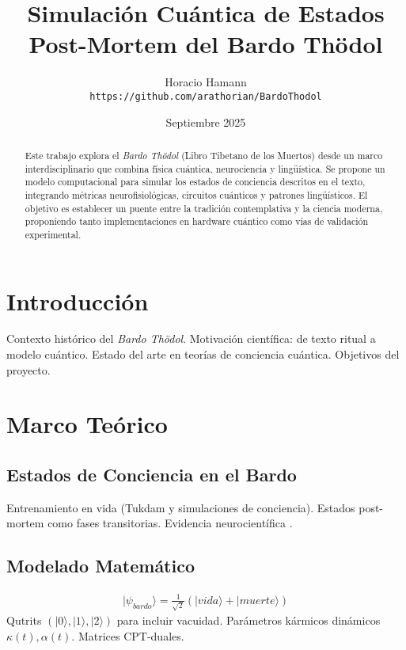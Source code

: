 \documentclass[12pt,a4paper]{article}
\title{\textbf{Simulación Cuántica de Estados Post-Mortem del Bardo Thödol}}
\author{Horacio Hamann \\ \texttt{https://github.com/arathorian/BardoThodol}}
\date{Septiembre 2025}
\begin{document}
\maketitle

\begin{abstract}
Este trabajo explora el \emph{Bardo Thödol} (Libro Tibetano de los Muertos) 
desde un marco interdisciplinario que combina física cuántica, neurociencia 
y lingüística. Se propone un modelo computacional para simular los estados 
de conciencia descritos en el texto, integrando métricas neurofisiológicas, 
circuitos cuánticos y patrones lingüísticos. El objetivo es establecer un 
puente entre la tradición contemplativa y la ciencia moderna, proponiendo 
tanto implementaciones en hardware cuántico como vías de validación experimental.
\end{abstract}

\tableofcontents

\section{Introducción}
Contexto histórico del \emph{Bardo Thödol}. Motivación científica: de texto 
ritual a modelo cuántico. Estado del arte en teorías de conciencia cuántica. 
Objetivos del proyecto.

\section{Marco Teórico}

\subsection{Estados de Conciencia en el Bardo}
Entrenamiento en vida (Tukdam y simulaciones de conciencia). Estados post-mortem 
como fases transitorias. Evidencia neurocientífica \cite{wisconsin2022gamma, mindlife2023tukdam}.

\subsection{Modelado Matemático}
\begin{align}
| \psi_{bardo} \rangle = \frac{1}{\sqrt{2}} (|vida\rangle + |muerte\rangle)
\end{align}
Qutrits $(|0\rangle, |1\rangle, |2\rangle)$ para incluir vacuidad. 
Parámetros kármicos dinámicos $\kappa(t), \alpha(t)$. 
Matrices CPT-duales.
\end{document}
